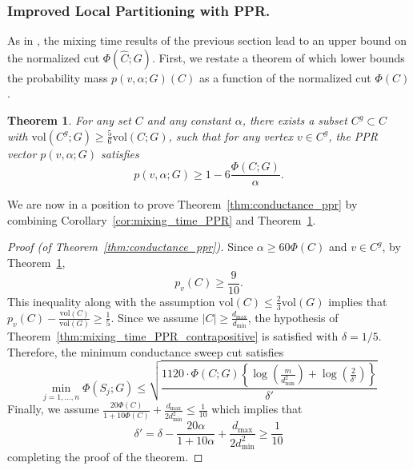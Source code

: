 \documentclass[11pt,twoside]{article}
\newtheorem{theorem}{Theorem}
\newcommand{\vol}{\mathrm{vol}}
\newcommand{\abs}[1]{\left \lvert #1 \right \rvert}
\newcommand{\1}{\mathbf{1}}
\begin{document}
\subsubsection{Improved Local Partitioning with PPR.}

As in \citet{andersen2006}, the mixing time results of the previous section lead to an upper bound on the normalized cut $\Phi(\widehat{C};G)$. First, we restate a theorem of \citet{andersen2006} which lower bounds the probability mass $p(v,\alpha;G)(C)$ as a function of the normalized cut $\Phi(C)$. 

\begin{theorem}
	\label{thm:acl_3}
	For any set $C$ and any constant $\alpha$, there exists a subset $C^g \subset C$ with $\vol(C^g;G) \geq \frac{5}{6}\vol(C;G)$, such that for any vertex $v \in C^g$, the PPR vector $p(v,\alpha;G)$ satisfies
	\begin{equation*}
	p(v,\alpha;G) \geq 1 - 6\frac{\Phi(C;G)}{\alpha}.
	\end{equation*}
\end{theorem}
We are now in a position to prove Theorem~\ref{thm:conductance_ppr} by combining Corollary~\ref{cor:mixing_time_PPR} and Theorem~\ref{thm:acl_3}.

\begin{proof}[Proof (of Theorem~\ref{thm:conductance_ppr})]
	Since $\alpha \geq 60\Phi(C)$ and $v \in C^g$, by Theorem~\ref{thm:acl_3},
	\begin{equation*}
	p_v(C) \geq \frac{9}{10}.
	\end{equation*}
	This inequality along with the assumption $\vol(C) \leq \frac{2}{3}\vol(G)$ implies that $p_v(C) - \frac{\vol(C)}{\vol(G)} \geq \frac{1}{5}$. Since we assume $\abs{C} \geq \frac{d_{\max}}{d_{\min}}$, the hypothesis of Theorem~\ref{thm:mixing_time_PPR_contrapositive} is satisfied with $\delta = 1/5$. Therefore, the minimum conductance sweep cut satisfies
	\begin{equation*}
	\min_{j = 1,\ldots,n} \Phi(S_j;G) \leq \sqrt{\frac{1120\cdot \Phi(C;G)\left\{\log\left(\frac{m}{d_{\min}^2}\right) + \log\left(\frac{2}{\delta'}\right)\right\}}{\delta'}}
	\end{equation*}
	Finally, we assume $\frac{20\Phi(C)}{1 + 10\Phi(C)} + \frac{d_{\max}}{2d_{\min}^2} \leq \frac{1}{10}$ which implies that
	\begin{equation*}
	\delta' = \delta - \frac{20\alpha}{1 + 10\alpha} + \frac{d_{\max}}{2d_{\min}^2} \geq \frac{1}{10} 
	\end{equation*}
	completing the proof of the theorem.
\end{proof}
\end{document}

